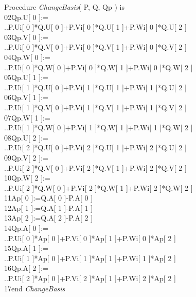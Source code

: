 \documentclass[12pt, a4paper]{article}
\begin{document}
\begin{ttfamily}
\quad Procedure {\em ChangeBasis}( P, Q, Qp ) is\\
02\quad Qp.U[ 0 ]:=\\
..\quad\quad P.Ui[ 0 ]*Q.U[ 0 ]+P.Vi[ 0 ]*Q.U[ 1 ]+P.Wi[ 0 ]*Q.U[ 2 ]\\
03\quad Qp.V[ 0 ]:=\\
..\quad\quad P.Ui[ 0 ]*Q.V[ 0 ]+P.Vi[ 0 ]*Q.V[ 1 ]+P.Wi[ 0 ]*Q.V[ 2 ]\\
04\quad Qp.W[ 0 ]:=\\
..\quad\quad P.Ui[ 0 ]*Q.W[ 0 ]+P.Vi[ 0 ]*Q.W[ 1 ]+P.Wi[ 0 ]*Q.W[ 2 ]\\
05\quad Qp.U[ 1 ]:=\\
..\quad\quad P.Ui[ 1 ]*Q.U[ 0 ]+P.Vi[ 1 ]*Q.U[ 1 ]+P.Wi[ 1 ]*Q.U[ 2 ]\\
06\quad Qp.V[ 1 ]:=\\
..\quad\quad P.Ui[ 1 ]*Q.V[ 0 ]+P.Vi[ 1 ]*Q.V[ 1 ]+P.Wi[ 1 ]*Q.V[ 2 ]\\
07\quad Qp.W[ 1 ]:=\\
..\quad\quad P.Ui[ 1 ]*Q.W[ 0 ]+P.Vi[ 1 ]*Q.W[ 1 ]+P.Wi[ 1 ]*Q.W[ 2 ]\\
08\quad Qp.U[ 2 ]:=\\
..\quad\quad P.Ui[ 2 ]*Q.U[ 0 ]+P.Vi[ 2 ]*Q.U[ 1 ]+P.Wi[ 2 ]*Q.U[ 2 ]\\
09\quad Qp.V[ 2 ]:=\\
..\quad\quad P.Ui[ 2 ]*Q.V[ 0 ]+P.Vi[ 2 ]*Q.V[ 1 ]+P.Wi[ 2 ]*Q.V[ 2 ]\\
10\quad Qp.W[ 2 ]:=\\
..\quad\quad P.Ui[ 2 ]*Q.W[ 0 ]+P.Vi[ 2 ]*Q.W[ 1 ]+P.Wi[ 2 ]*Q.W[ 2 ]\\
11\quad Ap[ 0 ]:=Q.A[ 0 ]-P.A[ 0 ]\\
12\quad Ap[ 1 ]:=Q.A[ 1 ]-P.A[ 1 ]\\
13\quad Ap[ 2 ]:=Q.A[ 2 ]-P.A[ 2 ]\\
14\quad Qp.A[ 0 ]:=\\
..\quad\quad P.Ui[ 0 ]*Ap[ 0 ]+P.Vi[ 0 ]*Ap[ 1 ]+P.Wi[ 0 ]*Ap[ 2 ]\\
15\quad Qp.A[ 1 ]:=\\
..\quad\quad P.Ui[ 1 ]*Ap[ 0 ]+P.Vi[ 1 ]*Ap[ 1 ]+P.Wi[ 1 ]*Ap[ 2 ]\\
16\quad Qp.A[ 2 ]:=\\
..\quad\quad P.Ui[ 2 ]*Ap[ 0 ]+P.Vi[ 2 ]*Ap[ 1 ]+P.Wi[ 2 ]*Ap[ 2 ]\\
17\quad end {\em ChangeBasis}\\
\end{ttfamily}
\end{document}
